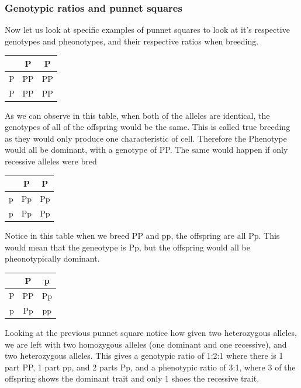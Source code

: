 \documentclass{article}
\begin{document}
\subsubsection*{Genotypic ratios and punnet squares}
Now let us look at specific examples of punnet squares to look at it's respective genotypes and pheonotypes, and their respective ratios when breeding.

\begin{center}
    \begin{tabular}{ c | c |c }
      & P & P \\ 
      \hline
     P & PP & PP \\  
      \hline
     P & PP & PP    
    \end{tabular}
\end{center}

As we can observe in this table, when both of the alleles are identical, the genotypes of all of the offspring would be the same. This is called true breeding as they would only produce one characteristic of cell. Therefore the Phenotype would all be dominant, with a genotype of PP. The same would happen if only recessive alleles were bred 

\begin{center}
    \begin{tabular}{ c | c |c }
      & P & P \\ 
      \hline
     p & Pp & Pp \\  
      \hline
     p & Pp & Pp    
    \end{tabular}
\end{center}

Notice in this table when we breed PP and pp, the offspring are all Pp. This would mean that the geneotype is Pp, but the offspring would all be pheonotypically dominant.

\begin{center}
    \begin{tabular}{ c | c | c }
      & P & p \\ 
      \hline
     P & PP & Pp \\
     \hline  
     p & Pp & pp    
    \end{tabular}
\end{center}

Looking at the previous punnet square notice how given two heterozygous alleles, we are left with two homozygous alleles (one dominant and one recessive), and two heterozygous alleles. This gives a genotypic ratio of 1:2:1 where there is 1 part PP, 1 part pp, and 2 parts Pp, and a phenotypic ratio of 3:1, where 3 of the offspring shows the dominant trait and only 1 shoes the recessive trait.
\end{document}
